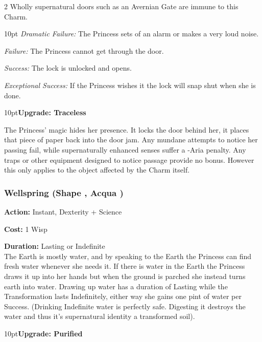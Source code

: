\begin{multicols}{2}
Wholly supernatural doors such as an Avernian Gate are immune to this Charm.  

\begin{myindentpar}{10pt}    \emph{Dramatic Failure:} The Princess sets of an alarm or makes a very loud noise. 

\emph{Failure:} The Princess cannot get through the door. 

\emph{Success:} The lock is unlocked and opens.

\emph{Exceptional Success:} If the Princess wishes it the lock will snap shut when she is done.\end{myindentpar}

\begin{myindentpar}{10pt}\textbf{Upgrade: Traceless}

The Princess’ magic hides her presence. It locks the door behind her, it places that piece of paper back into the door jam. Any mundane attempts to notice her passing fail, while supernaturally enhanced senses suffer a -Aria penalty. Any traps or other equipment designed to notice passage provide no bonus. However this only applies to the object affected by the Charm itself. 

\end{myindentpar}

\subsubsection*{Wellspring (Shape \textbullet, Acqua \textbullet)}

\noindent \textbf{Action:} Instant, Dexterity + Science

\noindent \textbf{Cost:} 1 Wisp

\noindent \textbf{Duration:} Lasting or Indefinite\\

\noindent The Earth is mostly water, and by speaking to the Earth the Princess can find fresh water whenever she needs it. If there is water in the Earth the Princess draws it up into her hands but when the ground is parched she instead turns earth into water. Drawing up water has a duration of Lasting while the Transformation lasts Indefinitely, either way she gains one pint of water per Success. (Drinking Indefinite water is perfectly safe. Digesting it destroys the water and thus it's supernatural identity a transformed soil).

\begin{myindentpar}{10pt}\textbf{Upgrade: Purified}


\end{myindentpar}
\end{multicols}

